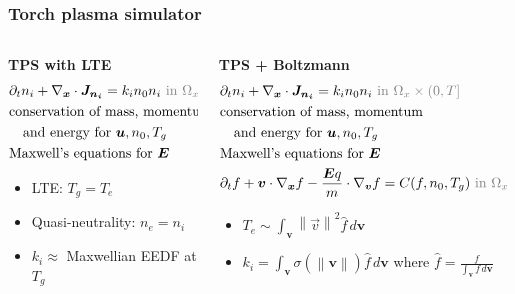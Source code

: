 \documentclass[mathserif, aspectratio=169]{beamer}
\newcommand{\vect}[1]{\boldsymbol{#1}}
\newcommand{\diff}[1]{\, d#1}
\newcommand{\norm}[1]{\left\lVert#1\right\rVert}
\begin{document}
\begin{frame}
	\frametitle{Torch plasma simulator}
	\begin{columns}
		\begin{column}{0.48\textwidth}
			\textbf{TPS with LTE}
			\footnotesize
			\begin{align*}
				&\partial_t n_i + \nabla_{\vect{x}} \cdot \vect{J_{n_i}}  = k_i n_0 n_i  \color{gray}{\text{ in } \Omega_x \times (0,T]}\\
				&\text{conservation of mass, momentum} \\
				&\quad  \text{and energy for } \vect{u}, n_0, T_g \\
				&\text{Maxwell's equations for } \vect{E}
			\end{align*}
			\begin{itemize}
				\item LTE: $T_g=T_e$ %
				\item Quasi-neutrality: $n_e = n_i$ 
				\item $k_i \approx$ Maxwellian EEDF at $T_g$
			\end{itemize}
		\end{column}
		\begin{column}{0.48\textwidth}
			\textbf{TPS + Boltzmann}
			\footnotesize
			\begin{align*}
				&\partial_t n_i + \nabla_{\vect{x}} \cdot \vect{J_{n_i}}  = k_i n_0 n_i  \color{gray}{\text{ in } \Omega_x \times (0,T]}\\
				&\text{conservation of mass, momentum} \\
				&\quad  \text{and energy for } \vect{u}, n_0, T_g \\
				&\text{Maxwell's equations for } \vect{E}\\
				&\partial_t f  + \vect{v} \cdot \nabla_{\vect{x}} f -\frac{\vect{E} q}{m} \cdot \nabla_{\vect{v }}f = C(f, n_0, T_g) \color{gray}{\text{ in } \Omega_x \times \Omega_v \times (0,T]}
			\end{align*}
			\begin{itemize}
				\item $T_e \sim \int_{\vect{v}} \norm{\vec{v}}^2 \hat{f} \diff{\vect{v}}$
				\item $k_i = \int_{\vect{v}} \sigma(\norm{\vect{v}}) \hat{f} \diff{\vect{v}}$ where $\hat{f} = \frac{f}{\int_{\vect{v}} f \diff{\vect{v}}}$
			\end{itemize}
		\end{column}
	\end{columns}


\end{frame}
\end{document}
